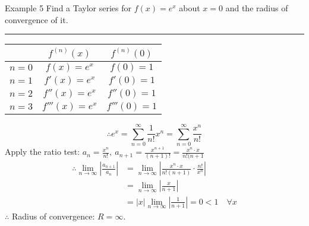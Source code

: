 \documentclass[12pt,a4paper]{article}
\begin{document}
\begin{eg}{Example 5}
	Find a Taylor series for $f(x)=e^x$ about $x=0$ and the radius of convergence of it. \\
	\noindent\rule[0.25\baselineskip]{\textwidth}{1pt}
	\begin{center}
		\begin{tabular}{c|c|c}
			&$f^{(n)}(x)$ & $f^{(n)}(0)$\\
			\hline
			$n=0$&$f(x)=e^x$&$f(0)=1$\\
			$n=1$&$f'(x)=e^x$&$f'(0)=1$\\
			$n=2$&$f''(x)=e^x$&$f''(0)=1$\\
			$n=3$&$f'''(x)=e^x$&$f'''(0)=1$
		\end{tabular}
	\end{center}
	$$\therefore e^x=\sum^\infty_{n=0}\frac{1}{n!}x^n=\sum^\infty_{n=0}\frac{x^n}{n!}$$
	Apply the ratio test: $\displaystyle a_n=\frac{x^n}{n!},\ a_{n+1}=\frac{x^{n+1}}{(n+1)!}=\frac{x^n\cdot x}{n!(n+1}$
	$$\begin{aligned}
		\therefore\lim_{n\to\infty}\left|\frac{a_{n+1}}{a_n}\right|&=\lim_{n\to\infty}\left|\frac{x^n\cdot x}{n!(n+1)}\cdot\frac{n!}{x^n}\right|\\
		&=\lim_{n\to\infty}\left|\frac{x}{n+1}\right|\\
		&=|x|\lim_{n\to\infty}\left|\frac{1}{n+1}\right|=0<1\quad\forall x
	\end{aligned}$$
	$\therefore$ Radius of convergence: $R=\infty$.
\end{eg}
\end{document}
